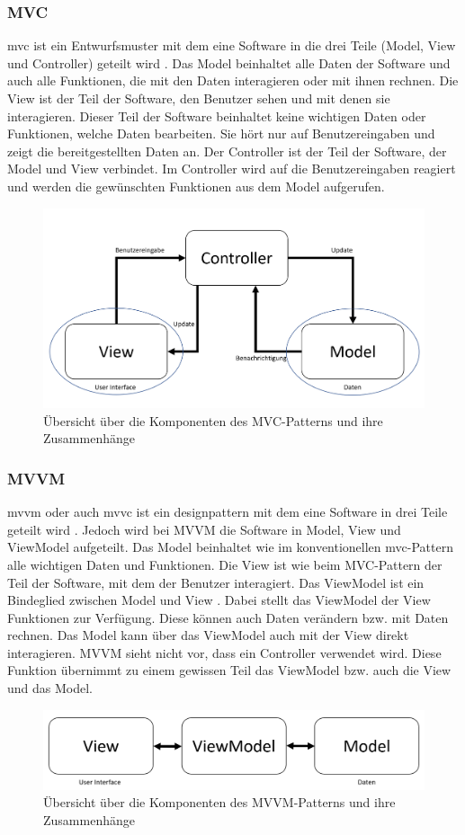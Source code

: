 \subsubsection{MVC}
\Gls{mvc} ist ein Entwurfsmuster mit dem eine Software in die drei Teile (Model, View und Controller) geteilt wird \cite{mvc}. Das Model beinhaltet alle Daten der Software und auch alle Funktionen, die mit den Daten interagieren oder mit ihnen rechnen. Die View ist der Teil der Software, den Benutzer sehen und mit denen sie interagieren. Dieser Teil der Software beinhaltet keine wichtigen Daten oder Funktionen, welche Daten bearbeiten. Sie hört nur auf Benutzereingaben und zeigt die bereitgestellten Daten an. Der Controller ist der Teil der Software, der Model und View verbindet. Im Controller wird auf die Benutzereingaben reagiert und werden die gewünschten Funktionen aus dem Model aufgerufen.
\begin{figure}[H]
	\centering
	\includegraphics[width=0.8\linewidth]{images/mvc}
	\caption[Übersicht des MVC-Patterns]{Übersicht über die Komponenten des MVC-Patterns und ihre Zusammenhänge}
	\label{fig:mvc}
\end{figure}
\subsubsection{MVVM}
\Gls{mvvm} oder auch \Gls{mvvc} ist ein \Gls{designpattern} mit dem eine Software in drei Teile geteilt wird \cite{mvvm_vue}. Jedoch wird bei MVVM die Software in Model, View und ViewModel aufgeteilt. 
Das Model beinhaltet wie im konventionellen \Gls{mvc}-Pattern alle wichtigen Daten und Funktionen. 
Die View ist wie beim MVC-Pattern der Teil der Software, mit dem der Benutzer interagiert. 
Das ViewModel ist ein Bindeglied zwischen Model und View \cite{mvvm_vue}. Dabei stellt das ViewModel der View Funktionen zur Verfügung. Diese können auch Daten verändern bzw. mit Daten rechnen. Das Model kann über das ViewModel auch mit der View direkt interagieren. 
MVVM sieht nicht vor, dass ein Controller verwendet wird. Diese Funktion übernimmt zu einem gewissen Teil das ViewModel bzw. auch die View und das Model.
\begin{figure}[H]
	\centering
	\includegraphics[width=0.8\linewidth]{images/mvvm}
	\caption[Übersicht des MVVM-Patterns]{Übersicht über die Komponenten des MVVM-Patterns und ihre Zusammenhänge}
	\label{fig:mvvm}
\end{figure}
\newpage
